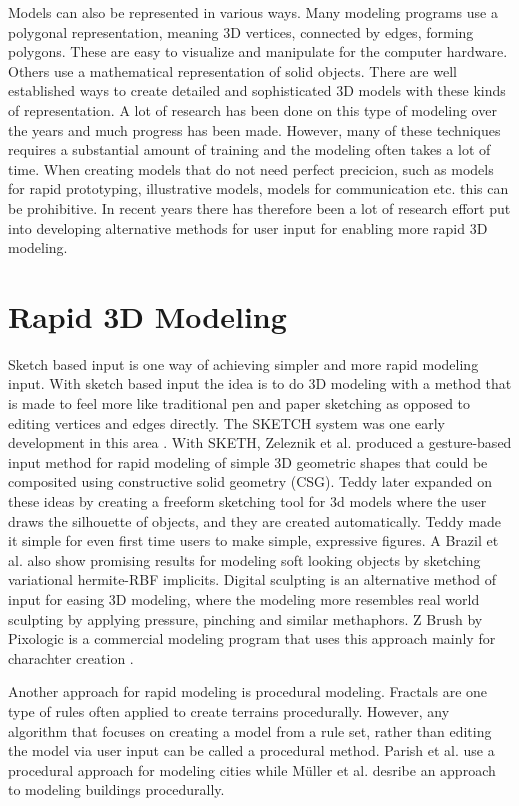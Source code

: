 \documentclass[a4paper,12pt]{report}
\begin{document}
Models can also be represented in various ways. Many modeling programs use a polygonal representation, meaning 3D vertices, connected by edges, forming polygons. These are easy to visualize and manipulate for the computer hardware.  Others use a mathematical representation of solid objects. There are well established ways to create detailed and sophisticated 3D models with these kinds of representation. A lot of research has been done on this type of modeling over the years and much progress has been made. However, many of these techniques requires a substantial amount of training and the modeling often takes a lot of time. When creating models that do not need perfect precicion, such as models for rapid prototyping, illustrative models, models for communication etc. this can be prohibitive. In recent years there has therefore been a lot of research effort put into developing alternative methods for user input for enabling more rapid 3D modeling.

\section{Rapid 3D Modeling}
 Sketch based input is one way of achieving simpler and more rapid modeling input. With sketch based input the idea is to do 3D modeling with a method that is made to feel more like traditional pen and paper sketching as opposed to editing vertices and edges directly.
The SKETCH system was one early development in this area \cite{zeleznik2007sketch}. With SKETH, Zeleznik et al. produced a gesture-based input method for rapid modeling of simple 3D geometric shapes that could be composited using constructive solid geometry (CSG). Teddy \cite{Igarashi:1999:TSI:311535.311602} later expanded on these ideas by creating a freeform sketching tool for 3d models where the user draws the silhouette of objects, and they are created automatically. Teddy made it simple for even first time users to make simple, expressive figures. A Brazil et al. \cite{brazil2010sketching} also show promising results for modeling soft looking objects by sketching variational hermite-RBF implicits.
Digital sculpting is an alternative method of input for easing 3D modeling, where the modeling more resembles real world sculpting by applying pressure, pinching and similar methaphors. Z Brush by Pixologic is a commercial modeling program that uses this approach mainly for charachter creation \cite{spencer2008zbrush}.

Another approach for rapid modeling is procedural modeling. Fractals are one type of rules often applied to create terrains procedurally.  However, any algorithm that focuses on creating a model from a rule set, rather than editing the model via user input can be called a procedural method. Parish et al. \cite{parish2001procedural} use a procedural approach for modeling cities while Müller \cite{muller2006procedural} et al. desribe an approach to modeling buildings procedurally. 
 
\end{document}
